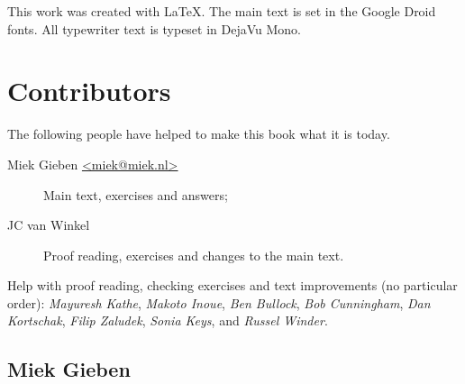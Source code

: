 \noindent{}This work was created with \LaTeX. The main text is set in
the Google Droid fonts. All typewriter text is typeset in DejaVu Mono.

\section{Contributors}
The following people have helped to make this book what it is today.
\begin{description}
\item[Miek Gieben \qquad\url{<miek@miek.nl>}] 
{Main text, exercises and answers;}

\item[JC van Winkel]
{Proof reading, exercises and changes to the main text.}
\end{description}

Help with proof reading, checking exercises and text improvements (no
particular order):
\emph{Mayuresh Kathe},
\emph{Makoto Inoue},
\emph{Ben Bullock},
\emph{Bob Cunningham},
\emph{Dan Kortschak},
\emph{Filip Zaludek},
\emph{Sonia Keys},
and \emph{Russel Winder}.

\subsection{Miek Gieben}

